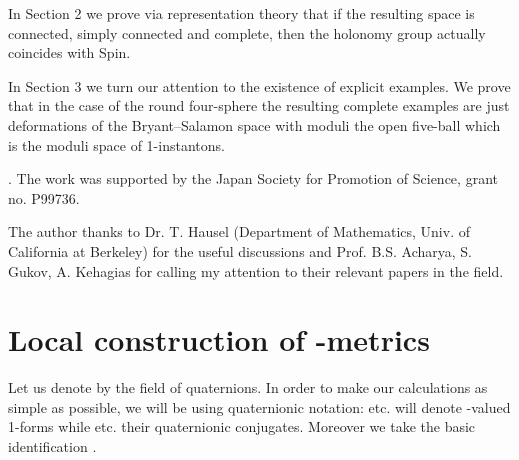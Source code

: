 \documentclass[a4paper,12pt,draft]{article}
\begin{document}
In Section 2 we prove via representation theory that if the resulting
space is connected, simply connected and complete, then the holonomy group
actually coincides with Spin\coordHE{}.

In Section 3 we turn our attention to the existence of explicit 
examples. We prove that in the case of the round four-sphere the
resulting complete examples are just deformations of the
Bryant--Salamon space \cite{bry-sal}\cite{gib-pag-pop} with moduli the
open five-ball which is the moduli space of 1-instantons. 
\vspace{0.1in}

. The work was supported by the Japan
Society for Promotion of Science, grant no. P99736.

The author thanks to Dr. T. Hausel (Department of Mathematics,
Univ. of California at Berkeley) for the useful discussions and Prof.
B.S. Acharya, S. Gukov, A. Kehagias for calling my attention to their
relevant papers in the field.

\section{Local construction of \coordHE{}-metrics}
Let us denote by \myHighlight{$\HH$}\coordHE{} the field of quaternions. In order to make our
calculations as simple as possible, we will be using quaternionic
notation: \myHighlight{$\eta ,\xi$}\coordHE{} etc. will denote \myHighlight{$\HH$}\coordHE{}-valued 1-forms while \myHighlight{$\oveta
,\ovxi$}\coordHE{} etc. their quaternionic conjugates. Moreover we take the basic
identification \coordHE{}.
\end{document}
